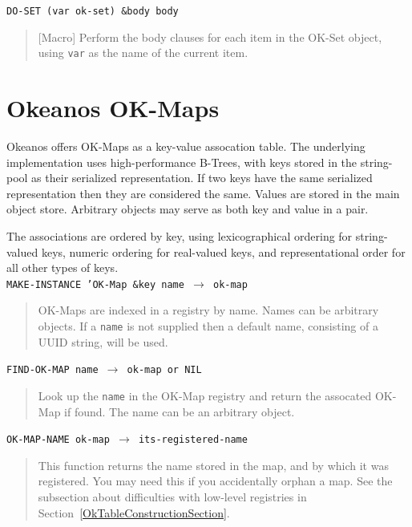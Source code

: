 \documentclass[article,oneside]{memoir}
\begin{document}
\noindent \texttt{DO-SET (var ok-set) \&body body}

\begin{quote}
[Macro] Perform the body clauses for each item in the OK-Set object, using \texttt{var} as the name of the current item.
\end{quote}

\chapter{Okeanos OK-Maps}
Okeanos offers OK-Maps as a key-value assocation table. The underlying implementation uses high-performance B-Trees, with keys stored in the string-pool as their serialized representation.  If two keys have the same serialized representation then they are considered the same. Values are stored in the main object store. Arbitrary objects may serve as both key and value in a pair. 

The associations are ordered by key, using lexicographical ordering for string-valued keys, numeric ordering for real-valued keys, and representational order for all other types of keys.
\\

\noindent \texttt{MAKE-INSTANCE 'OK-Map  \&key name $\rightarrow$ ok-map}

\begin{quote}
OK-Maps are indexed in a registry by name. Names can be arbitrary objects. If a \texttt{name} is not supplied then a default name, consisting of a UUID string, will be used.
\end{quote}

\noindent \texttt{FIND-OK-MAP name $\rightarrow$ ok-map or NIL}

\begin{quote}
Look up the \texttt{name} in the OK-Map registry and return the assocated OK-Map if found. The name can be an arbitrary object.
\end{quote}

\noindent \texttt{OK-MAP-NAME ok-map $\rightarrow$ its-registered-name}

\begin{quote}
This function returns the name stored in the map, and by which it was registered. You may need this if you accidentally orphan a map. See the subsection about difficulties with low-level registries in Section~\ref{OkTableConstructionSection}.
\end{quote}
\end{document}
